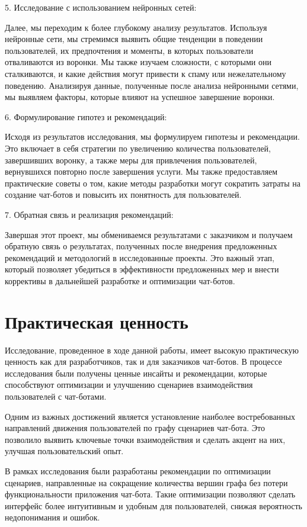 \documentclass{article}
\begin{document}
5. Исследование с использованием нейронных сетей:

Далее, мы переходим к более глубокому анализу результатов. Используя нейронные сети, мы стремимся выявить общие тенденции в поведении пользователей, их предпочтения и моменты, в которых пользователи отваливаются из воронки. Мы также изучаем сложности, с которыми они сталкиваются, и какие действия могут привести к спаму или нежелательному поведению. Анализируя данные, полученные после анализа нейронными сетями, мы выявляем факторы, которые влияют на успешное завершение воронки.

6. Формулирование гипотез и рекомендаций:

Исходя из результатов исследования, мы формулируем гипотезы и рекомендации. Это включает в себя стратегии по увеличению количества пользователей, завершивших воронку, а также меры для привлечения пользователей, вернувшихся повторно после завершения услуги. Мы также предоставляем практические советы о том, какие методы разработки могут сократить затраты на создание чат-ботов и повысить их понятность для пользователей.

7. Обратная связь и реализация рекомендаций:

Завершая этот проект, мы обмениваемся результатами с заказчиком и получаем обратную связь о результатах, полученных после внедрения предложенных рекомендаций и методологий в исследованные проекты. Это важный этап, который позволяет убедиться в эффективности предложенных мер и внести коррективы в дальнейшей разработке и оптимизации чат-ботов.
\section{Практическая ценность}
Исследование, проведенное в ходе данной работы, имеет высокую практическую ценность как для разработчиков, так и для заказчиков чат-ботов. В процессе исследования были получены ценные инсайты и рекомендации, которые способствуют оптимизации и улучшению сценариев взаимодействия пользователей с чат-ботами.

Одним из важных достижений является установление наиболее востребованных направлений движения пользователей по графу сценариев чат-бота. Это позволило выявить ключевые точки взаимодействия и сделать акцент на них, улучшая пользовательский опыт.

В рамках исследования были разработаны рекомендации по оптимизации сценариев, направленные на сокращение количества вершин графа без потери функциональности приложения чат-бота. Такие оптимизации позволяют сделать интерфейс более интуитивным и удобным для пользователей, снижая вероятность недопонимания и ошибок.
\end{document}
